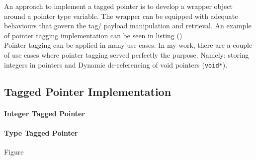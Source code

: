 An approach to implement a tagged pointer is to develop a wrapper object around a pointer type variable. The wrapper can be equipped with adequate behaviours that govern the tag/ payload manipulation and retrieval. An example of pointer tagging implementation can be seen in listing () \\
 
Pointer tagging can be applied in many use cases. In my work, there are a couple of use cases where pointer tagging served perfectly the purpose. Namely: storing integers in pointers and Dynamic de-referencing of void pointers (\texttt{void*}). 					

\subsection{Tagged Pointer Implementation}





\paragraph{Integer Tagged Pointer}

\paragraph{Type Tagged Pointer} 
Figure

\clearpage